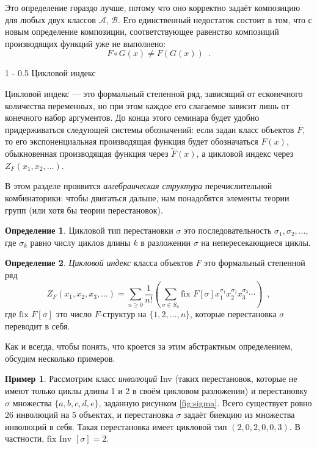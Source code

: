 \documentclass{article}
\makeatletter
\theoremstyle{definition}
\newtheorem{example}{Пример}
\newtheorem*{definition}{Определение}
\renewcommand{\section}{\@startsection
{section}%
{1}%
{\z@}%
{-\baselineskip}%
{0.5\baselineskip}%
{\centering\large\scshape}} %
\makeatother
\begin{document}
Это определение гораздо лучше, потому что оно корректно задаёт композицию для 
любых двух классов \( \mathcal A \), \( \mathcal B \). Его единственный 
недостаток состоит в том, что с новым определение композиции, соответствующее 
равенство композиций производящих функций уже не выполнено:
\[
	F \circ G(x) \neq F(G(x)) \enspace .
\]

\section{Цикловой индекс}

Цикловой индекс --- это формальный степенной ряд, зависящий от есконечного 
количества переменных, но при этом каждое его слагаемое зависит лишь от 
конечного набор аргументов. До конца этого семинара будет удобно придерживаться 
следующей системы обозначений: если задан класс объектов \( F \), то его 
экспоненциальная производящая функция будет обозначаться \( F(x) \), 
обыкновенная производящая функция через \( \widetilde F(x) \), а цикловой 
индекс через \( Z_F(x_1, x_2, \ldots) \).

В этом разделе проявится \textit{алгебраическая структура} перечислительной 
комбинаторики: чтобы двигаться дальше, нам понадобятся элементы теории групп 
(или хотя бы теории перестановок).

\begin{definition}
	Цикловой тип перестановки \( \sigma \) это последовательность \( \sigma_1, 
	\sigma_2, \ldots \), где \( \sigma_k \) равно числу циклов длины \( k \) в 
	разложении \( \sigma \) на непересекающиеся циклы.
\end{definition}

\begin{definition}
	\textit{Цикловой индекс} класса объектов \( F \) это формальный степенной 
	ряд
	\[
		Z_F(x_1, x_2, x_3, \ldots) = \sum_{n \geq 0} \dfrac{1}{n!} \left(
			\sum_{\sigma \in S_n} \text{fix } F[\sigma] 
			x_1^{\sigma_1}x_2^{\sigma_2} 
			x_3^{\sigma_3}\cdots
		\right) \enspace ,
	\]
	где \( \text{fix }F[\sigma] \) это число \( F \)-структур на \( \{1, 2, 
	\ldots, n\} \), которые перестановка \( \sigma \) переводит в себя.
\end{definition}

Как и всегда, чтобы понять, что кроется за этим абстрактным определением, 
обсудим несколько примеров.

\begin{example}
	Рассмотрим класс \textit{инволюций} Inv (таких перестановок, которые не 
	имеют только циклы длины 1 и 2 в своём цикловом разложении) и перестановку 
	\( \sigma \) множества \( \{a,b,c,d,e\} \), заданную рисунком 
	\ref{fig:sigma}. Всего существует ровно 26 инволюций на 5 объектах, и 
	перестановка \( \sigma \) задаёт биекцию из множества инволюций в себя. 
	Такая перестановка имеет цикловой тип \( (2, 0, 2, 0, 0, 3) \). В 
	частности, \( \text{fix Inv }[\sigma] = 2 \).
\end{example}
\end{document}
